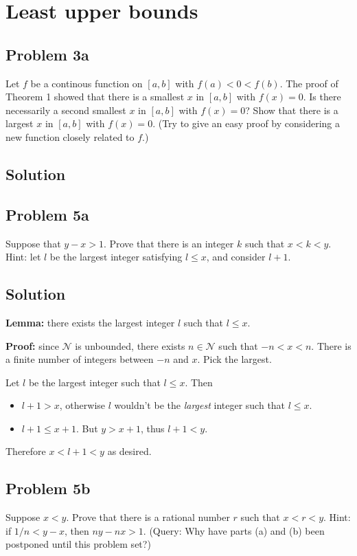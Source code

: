 \section{Least upper bounds}
\subsection*{Problem 3a}
Let $f$ be a continous function on $[a, b]$ with $f(a)<0<f(b)$. The
proof of Theorem 1 showed that there is a smallest $x$ in $[a,b]$ with
$f(x)=0$. Is there necessarily a second smallest $x$ in $[a,b]$ with
$f(x)=0$? Show that there is a largest $x$ in $[a,b]$ with $f(x)=0$.
(Try to give an easy proof by considering a new function closely
related to $f$.)

\subsection*{Solution}

\subsection*{Problem 5a}
Suppose that $y-x>1$. Prove that there is an integer $k$ such that
$x<k<y$. Hint: let $l$ be the largest integer satisfying $l\leq x$, and
consider $l+1$.

\subsection*{Solution}
\textbf{Lemma:} there exists the largest integer $l$ such that $l\leq x$.

\textbf{Proof:} since $\mathcal{N}$ is unbounded, there exists
$n\in\mathcal{N}$ such that $-n<x<n$. There is a finite number of integers between
$-n$ and $x$. Pick the largest.

\vs

Let $l$ be the largest integer such that $l\leq x$. Then
\begin{itemize}
\item $l+1>x$, otherwise $l$ wouldn't be the \textit{largest} integer
  such that $l\leq x$.
\item $l+1\leq x+1$. But $y>x+1$, thus $l+1<y$.
\end{itemize}

Therefore $x<l+1<y$ as desired.

\subsection*{Problem 5b}
Suppose $x<y$. Prove that there is a rational number $r$ such that
$x<r<y$. Hint: if $1/n<y-x$, then $ny-nx>1$. (Query: Why have parts
(a) and (b) been postponed until this problem set?)

